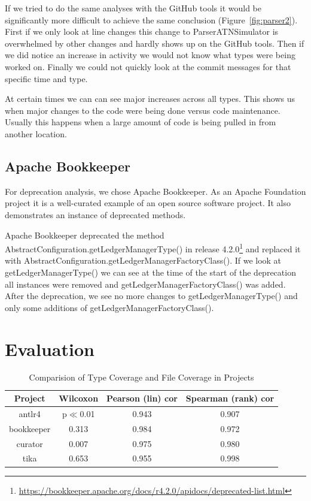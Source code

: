 \documentclass[conference]{IEEEtran}
\begin{document}
If we tried to do the same analyses with the GitHub tools it would be significantly more difficult to achieve the same conclusion (Figure~\ref{fig:parser2}). First if we only look at line changes this change to ParserATNSimulator is overwhelmed by other changes and hardly shows up on the GitHub tools. Then if we did notice an increase in activity we would not know what types were being worked on. Finally we could not quickly look at the commit messages for that specific time and type.

At certain times we can can see major increases across all types. This shows us when major changes to the code were being done versus code maintenance. Usually this happens when a large amount of code is being pulled in from another location.

\subsection{Apache Bookkeeper}

For deprecation analysis, we chose Apache Bookkeeper. As an Apache Foundation project it is a well-curated example of an open source software project. It also demonstrates an instance of deprecated methods. 

Apache Bookkeeper deprecated the method AbstractConfiguration.getLedgerManagerType() in release 4.2.0\footnote{\url{https://bookkeeper.apache.org/docs/r4.2.0/apidocs/deprecated-list.html}} and replaced it with AbstractConfiguration.getLedgerManagerFactoryClass(). If we look at getLedgerManagerType() we can see at the time of the start of the deprecation all instances were removed and getLedgerManagerFactoryClass() was added. After the deprecation, we see no more changes to getLedgerManagerType() and only some additions of getLedgerManagerFactoryClass().

\section{Evaluation}

\begin{table}[!t]
\renewcommand{\arraystretch}{1.3}
\caption{Comparision of Type Coverage and File Coverage in Projects}
\label{tab:summary}
\centering
\begin{tabular}{c|ccc}
\hline
\bfseries Project & \bfseries Wilcoxon & \bfseries Pearson (lin) cor & \bfseries Spearman (rank) cor \\
\hline
antlr4 & p$\ll$0.01 & 0.943 & 0.907\\
bookkeeper & 0.313 & 0.984 & 0.972\\
curator & 0.007 & 0.975 & 0.980\\
tika & 0.653 & 0.955 & 0.998\\
\hline
\end{tabular}
\end{table}
\end{document}
